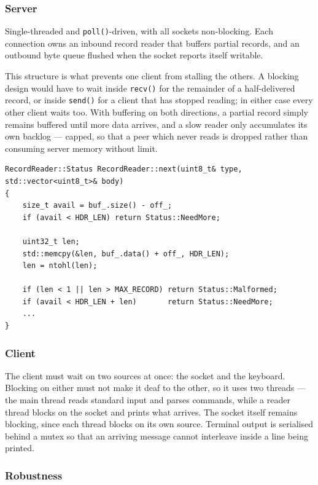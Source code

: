 \documentclass[11pt,a4paper]{article}
\begin{document}
\subsubsection{Server}

Single-threaded and \texttt{poll()}-driven, with all sockets non-blocking. Each connection owns an
inbound record reader that buffers partial records, and an outbound byte queue flushed when the
socket reports itself writable.

This structure is what prevents one client from stalling the others. A blocking design would have to
wait inside \texttt{recv()} for the remainder of a half-delivered record, or inside \texttt{send()}
for a client that has stopped reading; in either case every other client waits too. With buffering
on both directions, a partial record simply remains buffered until more data arrives, and a slow
reader only accumulates its own backlog --- capped, so that a peer which never reads is dropped
rather than consuming server memory without limit.

\begin{lstlisting}[style=cpp,caption={Incremental record extraction (\texttt{proto.cpp}).}]
RecordReader::Status RecordReader::next(uint8_t& type, std::vector<uint8_t>& body)
{
    size_t avail = buf_.size() - off_;
    if (avail < HDR_LEN) return Status::NeedMore;

    uint32_t len;
    std::memcpy(&len, buf_.data() + off_, HDR_LEN);
    len = ntohl(len);

    if (len < 1 || len > MAX_RECORD) return Status::Malformed;
    if (avail < HDR_LEN + len)       return Status::NeedMore;
    ...
}
\end{lstlisting}

\subsubsection{Client}

The client must wait on two sources at once: the socket and the keyboard. Blocking on either must
not make it deaf to the other, so it uses two threads --- the main thread reads standard input and
parses commands, while a reader thread blocks on the socket and prints what arrives. The socket
itself remains blocking, since each thread blocks on its own source. Terminal output is serialised
behind a mutex so that an arriving message cannot interleave inside a line being printed.

\subsubsection{Robustness}
\end{document}
